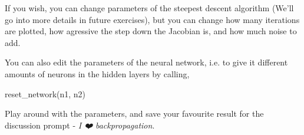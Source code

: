 \documentclass[11pt]{article}
\newenvironment{Shaded}{}{}
\newcommand{\NormalTok}[1]{{#1}}
\begin{document}
    
    If you wish, you can change parameters of the steepest descent algorithm
(We'll go into more details in future exercises), but you can change how
many iterations are plotted, how agressive the step down the Jacobian
is, and how much noise to add.

You can also edit the parameters of the neural network, i.e. to give it
different amounts of neurons in the hidden layers by calling,

\begin{Shaded}
\begin{Highlighting}[]
\NormalTok{reset_network(n1, n2)}
\end{Highlighting}
\end{Shaded}

Play around with the parameters, and save your favourite result for the
discussion prompt - \emph{I ❤️ backpropagation}.


    
    
    
    
\end{document}
